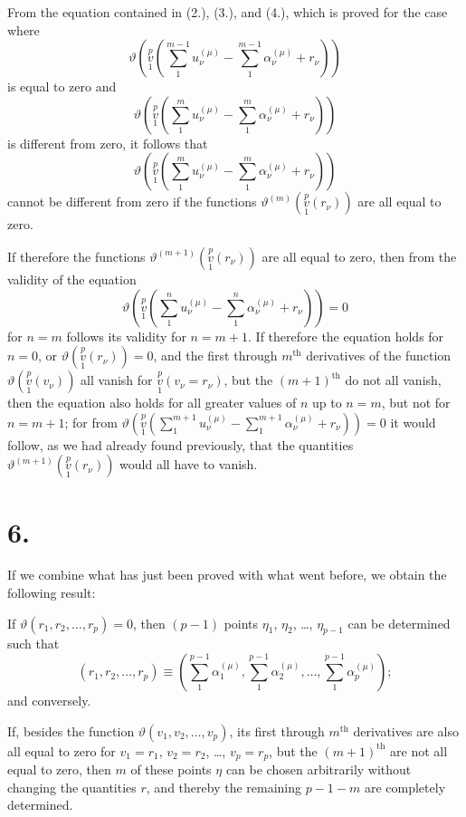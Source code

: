 \documentclass{article}
\begin{document}
From the equation contained in (2.), (3.), and (4.), which is proved for the case where
\[
\vartheta\left(\overset{p}{\underset{1}{v}}\left(\sum_1^{m-1} u_\nu^{(\mu)} - \sum_1^{m-1} \alpha_\nu^{(\mu)} + r_\nu\right)\right)
\]
is equal to zero and
\[
\vartheta\left(\overset{p}{\underset{1}{v}}\left(\sum_1^m u_\nu^{(\mu)} - \sum_1^m \alpha_\nu^{(\mu)} + r_\nu\right)\right)
\]
is different from zero, it follows that
\[
\vartheta\left(\overset{p}{\underset{1}{v}}\left(\sum_1^m u_\nu^{(\mu)} - \sum_1^m \alpha_\nu^{(\mu)} + r_\nu\right)\right)
\]
cannot be different from zero if the functions $\vartheta^{(m)}\left(\overset{p}{\underset{1}{v}}(r_\nu)\right)$ are all equal to zero.

If therefore the functions $\vartheta^{(m+1)}\left(\overset{p}{\underset{1}{v}}(r_\nu)\right)$ are all equal to zero, then from the validity of the equation
\[
\vartheta\left(\overset{p}{\underset{1}{v}}\left(\sum_1^n u_\nu^{(\mu)} - \sum_1^n \alpha_\nu^{(\mu)} + r_\nu\right)\right) = 0
\]
for $n=m$ follows its validity for $n=m+1$. If therefore the equation holds for $n=0$, or $\vartheta\left(\overset{p}{\underset{1}{v}}(r_\nu)\right) = 0$, and the first through $m^{\text{th}}$ derivatives of the function $\vartheta\left(\overset{p}{\underset{1}{v}}(v_\nu)\right)$ all vanish for $\overset{p}{\underset{1}{v}}(v_\nu = r_\nu)$, but the $(m+1)^{\text{th}}$ do not all vanish,
then the equation also holds for all greater values of $n$ up to $n=m$, but not for $n=m+1$; for from $\displaystyle\vartheta\left(\overset{p}{\underset{1}{v}}\left(\sum_1^{m+1} u_\nu^{(\mu)} - \sum_1^{m+1} \alpha_\nu^{(\mu)} + r_\nu\right)\right) = 0$ it would follow, as we had already found previously, that the quantities $\vartheta^{(m+1)}\left(\overset{p}{\underset{1}{v}}(r_\nu)\right)$ would all have to vanish.

\section*{6.}

If we combine what has just been proved with what went before, we obtain the following result:

If $\vartheta(r_1, r_2, \dots, r_p) = 0$, then $(p-1)$ points $\eta_1$, $\eta_2$, \dots, $\eta_{p-1}$ can be determined such that
\[
(r_1, r_2, \dots, r_p) \equiv \left(\sum_1^{p-1} \alpha_1^{(\mu)}, \sum_1^{p-1} \alpha_2^{(\mu)}, \dots, \sum_1^{p-1} \alpha_p^{(\mu)}\right);
\]
and conversely.

If, besides the function $\vartheta(v_1, v_2, \dots, v_p)$, its first through $m^{\text{th}}$ derivatives are also all equal to zero for $v_1 = r_1$, $v_2 = r_2$, \dots, $v_p = r_p$, but the $(m+1)^{\text{th}}$ are not all equal to zero, then $m$ of these points $\eta$ can be chosen arbitrarily without changing the quantities $r$, and thereby the remaining $p-1-m$ are completely determined.
\end{document}
